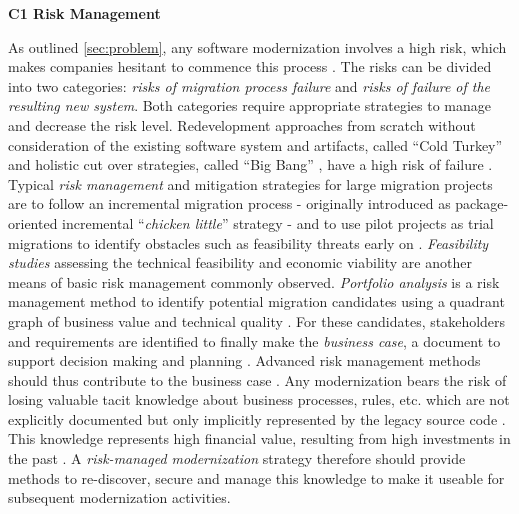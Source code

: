 \textbf{C1 Risk Management}

As outlined \cref{sec:problem}, any software modernization involves a high risk, which makes companies hesitant to commence this process \autocite{Khadka2014ProfessionalsModernization,Canfora2000Decomposing,Bisbal1999LegacyInformationSystems,Heil2018ReWaMP}.
The risks can be divided into two categories: \emph{risks of migration process failure} and \emph{risks of failure of the resulting new system}.
Both categories require appropriate strategies to manage and decrease the risk level.
Redevelopment approaches from scratch without consideration of the existing software system and artifacts, called ``Cold Turkey'' \autocite{Brodie1995Migrating} and holistic cut over strategies, called ``Big Bang'' \autocite{Bisbal1999LegacyInformationSystems}, have a high risk of failure \autocite{Sneed2010SoftwareMigration,Bisbal1999LegacyInformationSystems}.
Typical \emph{risk management} \autocite{ISO/IEEE24765Vocabulary} and mitigation strategies for large migration projects are to follow an incremental migration process \autocite{Colosimo2007ControlledExperiments,Sneed2010SoftwareMigration} - originally introduced as package-oriented incremental ``\emph{chicken little}'' strategy \autocite{Brodie1995Migrating} - and to use pilot projects as trial migrations to identify obstacles such as feasibility threats early on \autocite{AmazonWebServices2018Migration,Sneed2010SoftwareMigration}.
\emph{Feasibility studies} assessing the technical feasibility and economic viability \autocite{ISO/IEEE24765Vocabulary} are another means of basic risk management commonly observed.
\emph{Portfolio analysis} is a risk management method to identify potential migration candidates using a quadrant graph of business value and technical quality \autocite{Seacord2003ModernizingLS,Sneed1995CostBenefit}.
For these candidates, stakeholders and requirements are identified to finally make the \emph{business case}, a document to support decision making and planning \autocite{AmazonWebServices2018Migration,Seacord2003ModernizingLS}.
Advanced risk management methods should thus contribute to the business case \autocite{Seacord2003ModernizingLS}.
Any modernization bears the risk of losing valuable tacit knowledge about business processes, rules, etc.
\autocite{Aversano2001,Distante2006a,Sneed2010SoftwareMigration,Wagner2014Fundamentals} which are not explicitly documented but only implicitly represented by the legacy source code \autocite{Khadka2014ProfessionalsModernization,Heil2017Survey}.
This knowledge represents high financial value, resulting from high investments in the past \autocite{Lucia2009METAMORPHOS}.
A \emph{risk-managed modernization} strategy \autocite{Seacord2003ModernizingLS} therefore should provide methods to re-discover, secure and manage this knowledge to make it useable for subsequent modernization activities.

